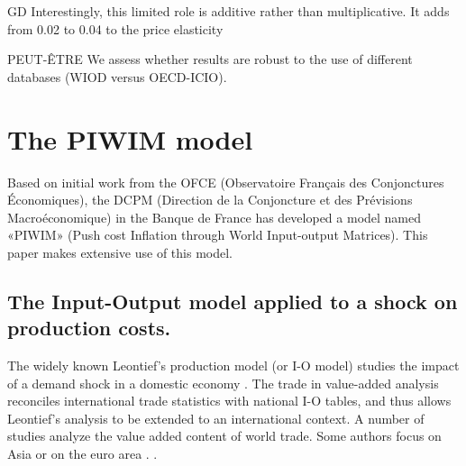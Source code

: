 \documentclass[11pt,a4paper]{article}
\begin{document}
GD Interestingly, this limited role is additive rather than multiplicative. It adds from 0.02 to 0.04 to the price elasticity

PEUT-ÊTRE We assess whether results are robust to the use of different databases (WIOD versus OECD-ICIO). 

\section{The PIWIM model }
\label{sec:metho}
Based on initial work from the OFCE (Observatoire Français des Conjonctures Économiques), the DCPM (Direction de la Conjoncture et des Prévisions Macroéconomique) in the Banque de France has developed a model named «PIWIM» (Push cost Inflation through World Input-output Matrices). This paper makes extensive use of this model.

\subsection{The Input-Output model applied to a shock on production costs.}
\label{subsec:io}
The widely known Leontief's production model (or I-O model) studies the impact of a demand shock in a domestic economy \citep{Leontief1951}. The trade in value-added analysis reconciles international trade statistics with national I-O tables, and thus allows Leontief's analysis to be extended to an international context. A number of studies \citep{Hummels2001,Daudin2006,Daudin2011, DeBacker2012,Johnson2012,Koopman2014, Amador2015,Los2016} analyze the value added content of world trade. Some authors focus on Asia \citep{Sato2014} or on the euro area \citep{Cappariello2015}. .
\end{document}
